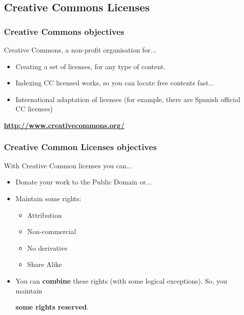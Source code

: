 


\subsection{Creative Commons Licenses}


\begin{frame}
\frametitle{Creative Commons objectives}

Creative Commons, a non-profit organisation for...

\begin{itemize}
\item Creating a set of licenses, for any type of content.
\item Indexing CC licensed works, so you can locate free contents fast...
\item International adaptation of licenses (for example, there are
  Spanish official CC licenses)
\end{itemize}
\vspace{1cm}
\begin{center}
{\LARGE
\textbf{\url{http://www.creativecommons.org/}}
}
\end{center}

\end{frame}


\begin{frame}
\frametitle{Creative Common Licenses objectives}

With Creative Common licenses you can...

\begin{itemize}
\item Donate your work to the Public Domain or...
\item Maintain some rights:
\begin{itemize}
\item Attribution
\item Non-commercial
\item No derivative
\item Share Alike
\end{itemize}
\item You can {\bf combine} these rights (with some logical exceptions). So, you maintain
\begin{center}
{\LARGE{\bf some rights reserved}}.
\end{center}
\end{itemize}

\end{frame}

